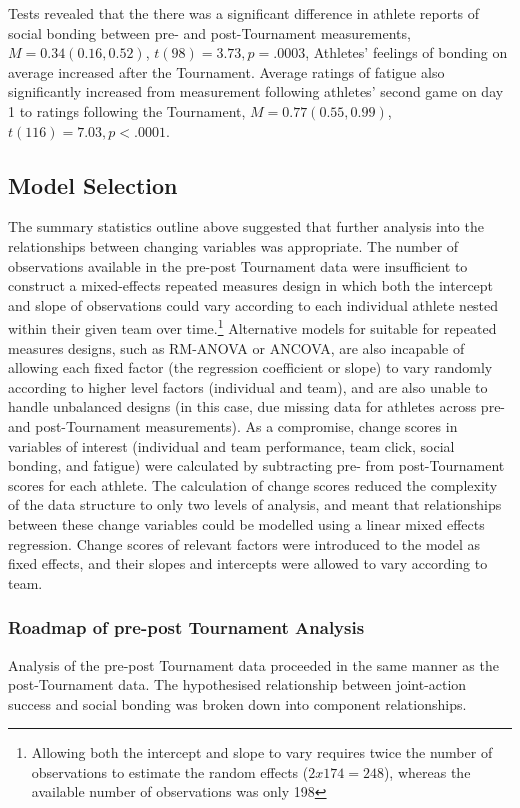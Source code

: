 \documentclass[12pt]{report}
\begin{document}
{Tests revealed that the there was a significant difference in athlete reports of social bonding between pre- and post-Tournament measurements, $M = 0.34 (0.16, 0.52)$, $t(98)= 3.73, p = .0003$, Athletes' feelings of bonding on average increased after the Tournament.  Average ratings of fatigue also significantly increased from measurement following athletes' second game on day 1  to ratings following the Tournament, $M =  0.77 (0.55, 0.99)$, $t(116)= 7.03, p < .0001$.
\clearpage




\subsection{Model Selection}
The summary statistics outline above suggested that further analysis into the relationships between changing variables was appropriate. The number of observations available in the pre-post Tournament data were insufficient to construct a mixed-effects repeated measures design in which both the intercept and slope of observations could vary according to each individual athlete nested within their given team over time.\footnote{Allowing both the intercept and slope to vary requires twice the number of observations to estimate the random effects ($2x174 = 248$), whereas the available number of observations was only 198} Alternative models for suitable for repeated measures designs, such as RM-ANOVA or ANCOVA, are also incapable of allowing each fixed factor (the regression coefficient or slope) to vary randomly according to higher level factors (individual and team), and are also unable to handle unbalanced designs (in this case, due missing data for athletes across pre- and post-Tournament measurements). As a compromise, change scores in variables of interest (individual and team performance, team click, social bonding, and fatigue) were calculated by subtracting pre- from post-Tournament scores for each athlete. The calculation of change scores reduced the complexity of the data structure to only two levels of analysis, and meant that relationships between these change variables could be modelled using a linear mixed effects regression. Change scores of relevant factors were introduced to the model as fixed effects, and their slopes and intercepts were allowed to vary according to team.





\subsubsection{Roadmap of pre-post Tournament Analysis}
Analysis of the pre-post Tournament data proceeded in the same manner as the post-Tournament data. The hypothesised relationship between joint-action success and social bonding was broken down into component relationships. \\

}
\end{document}
